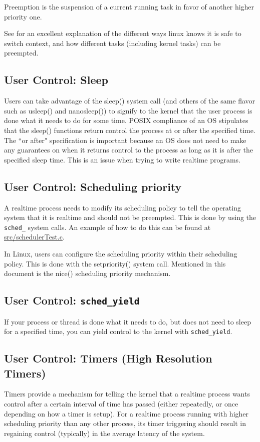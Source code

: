 \documentclass{article}
\begin{document}
Preemption is the suspension of a current running task in favor of another higher priority one.

See \cite{LinuxProcessSwitch} for an excellent explanation of the different ways linux knows it is safe to switch context, and how different tasks (including kernel tasks) can be preempted.

\subsection{User Control: Sleep}
Users can take advantage of the sleep() system call (and others of the same flavor such as usleep() and nanosleep()) to signify to the kernel that the user process is done what it needs to do for some time.  POSIX compliance of an OS stipulates that the sleep() functions return control the process at or after the specified time.  The ``or after" specification is important because an OS does not need to make any guarantees on when it returns control to the process as long as it is after the specified sleep time.  This is an issue when trying to write realtime programs.
\subsection{User Control: Scheduling priority}
A realtime process needs to modify its scheduling policy to tell the operating system that it is realtime and should not be preempted.  This is done by using the \texttt{sched\_\*} system calls.  An example of how to do this can be found at \href{https://github.com/ianohara/rt-linux-examples/blob/master/src/schedulerTest.c}{src/schedulerTest.c}.

In Linux, users can configure the scheduling priority within their scheduling policy.  This is done with the setpriority() system call.  Mentioned in this document is the nice() scheduling priority mechanism. 
\subsection{User Control: \texttt{sched\_yield}}
If your process or thread is done what it needs to do, but does not need to sleep for a specified time, you can yield control to the kernel with \texttt{sched\_yield}.
\subsection{User Control: Timers (High Resolution Timers)}
Timers provide a mechanism for telling the kernel that a realtime process wants control after a certain interval of time has passed (either repeatedly, or once depending on how a timer is setup).  For a realtime process running with higher scheduling priority than any other process, its timer triggering should result in regaining control (typically) in the average latency of the system.
\end{document}
